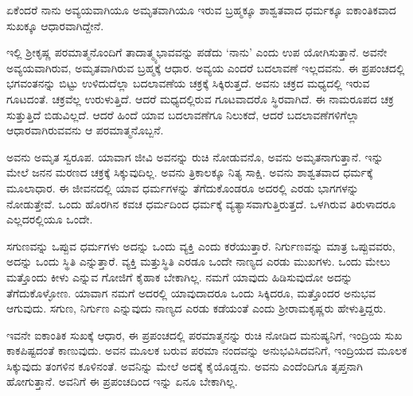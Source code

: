 \begin{artha}
ಏಕೆಂದರೆ ನಾನು ಅವ್ಯಯವಾಗಿಯೂ ಅಮೃತವಾಗಿಯೂ ಇರುವ ಬ್ರಹ್ಮಕ್ಕೂ ಶಾಶ್ವತವಾದ ಧರ್ಮಕ್ಕೂ ಐಕಾಂತಿಕವಾದ ಸುಖಕ್ಕೂ ಆಧಾರವಾಗಿದ್ದೇನೆ.
\end{artha}

ಇಲ್ಲಿ ಶ‍್ರೀಕೃಷ್ಣ ಪರಮಾತ್ಮನೊಂದಿಗೆ ತಾದಾತ್ಮ್ಯಭಾವವನ್ನು ಪಡೆದು ‘ನಾನು’ ಎಂದು ಉಪ ಯೋಗಿಸುತ್ತಾನೆ. ಅವನೇ ಅವ್ಯಯವಾಗಿರುವ, ಅಮೃತವಾಗಿರುವ ಬ್ರಹ್ಮಕ್ಕೆ ಆಧಾರ. ಅವ್ಯಯ ಎಂದರೆ ಬದಲಾವಣೆ ಇಲ್ಲದವನು. ಈ ಪ್ರಪಂಚದಲ್ಲಿ ಭಗವಂತನನ್ನು ಬಿಟ್ಟು ಉಳಿದುದೆಲ್ಲಾ ಬದಲಾವಣೆಯ ಚಕ್ರಕ್ಕೆ ಸಿಕ್ಕಿರುತ್ತದೆ. ಅವನು ಚಕ್ರದ ಮಧ್ಯದಲ್ಲಿ ಇರುವ ಗೂಟದಂತೆ. ಚಕ್ರವೆಲ್ಲ ಉರುಳುತ್ತಿದೆ. ಆದರೆ ಮಧ್ಯದಲ್ಲಿರುವ ಗೂಟವಾದರೊ ಸ್ಥಿರವಾಗಿದೆ. ಈ ನಾಮರೂಪದ ಚಕ್ರ ಸುತ್ತುತ್ತಿದೆ ಬಿಡುವಿಲ್ಲದೆ. ಆದರೆ ಹಿಂದೆ ಯಾವ ಬದಲಾವಣೆಗೂ ನಿಲುಕದೆ, ಆದರೆ ಬದಲಾವಣೆಗಳಿಗೆಲ್ಲಾ ಆಧಾರವಾಗಿರುವವನು ಆ ಪರಮಾತ್ಮನೊಬ್ಬನೆ.

\newpage

ಅವನು ಅಮೃತ ಸ್ವರೂಪ. ಯಾವಾಗ ಜೀವಿ ಅವನನ್ನು ರುಚಿ ನೋಡುವನೊ, ಅವನು ಅಮೃತನಾಗುತ್ತಾನೆ. ಇನ್ನು ಮೇಲೆ ಜನನ ಮರಣದ ಚಕ್ರಕ್ಕೆ ಸಿಕ್ಕುವುದಿಲ್ಲ. ಅವನು ತ್ರಿಕಾಲಕ್ಕೂ ನಿತ್ಯ ಸಾಕ್ಷಿ. ಅವನು ಶಾಶ್ವತವಾದ ಧರ್ಮಕ್ಕೆ ಮೂಲಾಧಾರ. ಈ ಜೀವನದಲ್ಲಿ ಯಾವ ಧರ್ಮಗಳನ್ನು ತೆಗೆದುಕೊಂಡರೂ ಅದರಲ್ಲಿ ಎರಡು ಭಾಗಗಳನ್ನು ನೋಡುತ್ತೇವೆ. ಒಂದು ಹೊರಗಿನ ಕವಚ ಧರ್ಮದಿಂದ ಧರ್ಮಕ್ಕೆ ವ್ಯತ್ಯಾಸವಾಗುತ್ತಿರುತ್ತದೆ. ಒಳಗಿರುವ ತಿರುಳಾದರೂ ಎಲ್ಲದರಲ್ಲಿಯೂ ಒಂದೇ.

ಸಗುಣವನ್ನು ಒಪ್ಪುವ ಧರ್ಮಗಳು ಅದನ್ನು ಒಂದು ವ್ಯಕ್ತಿ ಎಂದು ಕರೆಯುತ್ತಾರೆ. ನಿರ್ಗುಣವನ್ನು ಮಾತ್ರ ಒಪ್ಪುವವರು, ಅದನ್ನು ಒಂದು ಸ್ಥಿತಿ ಎನ್ನುತ್ತಾರೆ. ವ್ಯಕ್ತಿ ಮತ್ತುಸ್ಥಿತಿ ಎರಡೂ ಒಂದೇ ನಾಣ್ಯದ ಎರಡು ಮುಖಗಳು. ಒಂದು ಮೇಲು ಮತ್ತೊಂದು ಕೀಳು ಎನ್ನುವ ಗೋಜಿಗೆ ಕೈಹಾಕ ಬೇಕಾಗಿಲ್ಲ. ನಮಗೆ ಯಾವುದು ಹಿಡಿಸುವುದೋ ಅದನ್ನು ತೆಗೆದುಕೊಳ್ಳೋಣ. ಯಾವಾಗ ನಮಗೆ ಅದರಲ್ಲಿ ಯಾವುದಾದರೂ ಒಂದು ಸಿಕ್ಕಿದರೂ, ಮತ್ತೊಂದರ ಅನುಭವ ಆಗುವುದು. ಸಗುಣ, ನಿರ್ಗುಣ ಎನ್ನುವುದು ನಾಣ್ಯದ ಎರಡು ಕಡೆಯಂತೆ ಎಂದು ಶ‍್ರೀರಾಮಕೃಷ್ಣರು ಹೇಳುತ್ತಿದ್ದರು.

ಇವನೇ ಐಕಾಂತಿಕ ಸುಖಕ್ಕೆ ಆಧಾರ, ಈ ಪ್ರಪಂಚದಲ್ಲಿ ಪರಮಾತ್ಮನನ್ನು ರುಚಿ ನೋಡಿದ ಮನುಷ್ಯನಿಗೆ, ಇಂದ್ರಿಯ ಸುಖ ಕಾಕಪಿಷ್ಟದಂತೆ ಕಾಣುವುದು. ಅವನ ಮೂಲಕ ಬರುವ ಪರಮಾ ನಂದವನ್ನು ಅನುಭವಿಸಿದವನಿಗೆ, ಇಂದ್ರಿಯದ ಮೂಲಕ ಸಿಕ್ಕುವುದು ತಂಗಳಿನ ಕೂಳಿನಂತೆ. ಅವನಿನ್ನು ಮೇಲೆ ಅದಕ್ಕೆ ಕೈಯೊಡ್ಡನು. ಅವನು ಎಂದೆಂದಿಗೂ ತೃಪ್ತನಾಗಿ ಹೋಗುತ್ತಾನೆ. ಅವನಿಗೆ ಈ ಪ್ರಪಂಚದಿಂದ ಇನ್ನು ಏನೂ ಬೇಕಾಗಿಲ್ಲ.

